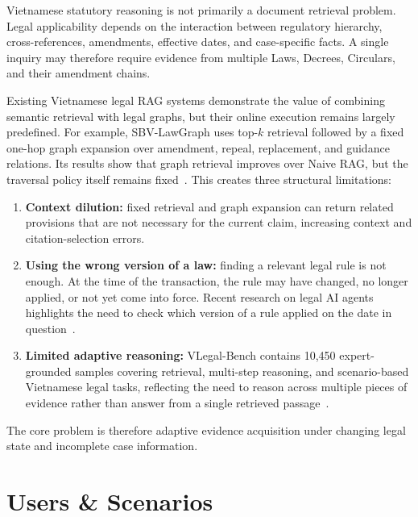 \documentclass[10pt,a4paper]{article}
\begin{document}
Vietnamese statutory reasoning is not primarily a document retrieval problem. Legal applicability depends on the interaction between regulatory hierarchy, cross-references, amendments, effective dates, and case-specific facts. A single inquiry may therefore require evidence from multiple Laws, Decrees, Circulars, and their amendment chains.

Existing Vietnamese legal RAG systems demonstrate the value of combining semantic retrieval with legal graphs, but their online execution remains largely predefined. For example, SBV-LawGraph uses top-$k$ retrieval followed by a fixed one-hop graph expansion over amendment, repeal, replacement, and guidance relations. Its results show that graph retrieval improves over Naive RAG, but the traversal policy itself remains fixed~\cite{phan2026sbvlawgraph}. This creates three structural limitations:

\begin{enumerate}
    \item \textbf{Context dilution:} fixed retrieval and graph expansion can return related provisions that are not necessary for the current claim, increasing context and citation-selection errors.

    \item \textbf{Using the wrong version of a law:} finding a relevant legal rule is not enough. At the time of the transaction, the rule may have changed, no longer applied, or not yet come into force. Recent research on legal AI agents highlights the need to check which version of a rule applied on the date in question~\cite{fan2026timetravel}.

    \item \textbf{Limited adaptive reasoning:} VLegal-Bench contains 10,450 expert-grounded samples covering retrieval, multi-step reasoning, and scenario-based Vietnamese legal tasks, reflecting the need to reason across multiple pieces of evidence rather than answer from a single retrieved passage~\cite{nguyen2026vlegalbench}.
\end{enumerate}

The core problem is therefore adaptive evidence acquisition under changing legal state and incomplete case information.

\section{Users \& Scenarios}
\end{document}
